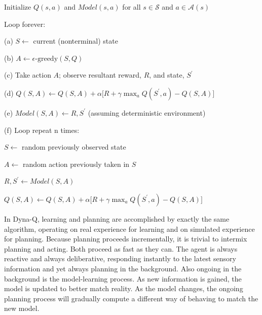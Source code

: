 \documentclass{article}
\begin{document}
Initialize $Q ( s , a )$ and $M o d e l ( s , a )$ for all $s \in \mathcal { S }$ and $a \in { \mathcal { A } } ( s )$

Loop forever:

\hspace{.5cm} (a) $S \leftarrow$ current (nonterminal) state

\hspace{.5cm} (b) $A \leftarrow \epsilon \text {-greedy} ( S , Q )$

\hspace{.5cm} (c) Take action $A$; observe resultant reward, $R$, and state, $S^{\prime}$

\hspace{.5cm} (d) $ Q ( S , A ) \leftarrow Q ( S , A ) + \alpha \big [ R + \gamma \operatorname* { m a x } _ { a } Q ( S ^ { \prime } , a ) - Q ( S , A ) \big ] $

\hspace{.5cm} (e) $Model ( S , A ) \leftarrow R , S ^ { \prime }$ (assuming deterministic environment)

\hspace{.5cm} (f) Loop repeat n times:

\hspace{1cm} $S \leftarrow$ random previously observed state

\hspace{1cm} $A \leftarrow$ random action previously taken in $S$

\hspace{1cm} $R , S ^ { \prime } \leftarrow M o d e l ( S , A )$

\hspace{1cm} $Q ( S , A ) \leftarrow Q ( S , A ) + \alpha \big [ R + \gamma \operatorname* { m a x } _ { a } Q ( S ^ { \prime } , a ) - Q ( S , A ) \big ] $

In Dyna-Q, learning and planning are accomplished by exactly the same algorithm, operating on real experience for learning and on simulated experience for planning. Because planning proceeds incrementally, 
it is trivial to intermix planning and acting. Both proceed as fast as they can. The agent is always reactive and always deliberative, responding instantly to the latest sensory information and yet always 
planning in the background. Also ongoing in the background is the model-learning process. As new information is gained, the model is updated to better match reality. As the model changes, the ongoing planning process 
will gradually compute a different way of behaving to match the new model.
\end{document}
